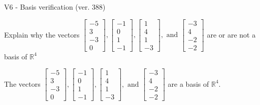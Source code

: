 \begin{exercise}
  \begin{exerciseTitle}V6 - Basis verification (ver. 388)\end{exerciseTitle}
  \begin{exerciseStatement}
    Explain why the vectors \(\left[\begin{array}{r}
-5 \\
3 \\
-3 \\
0
\end{array}\right] , \left[\begin{array}{r}
-1 \\
0 \\
1 \\
-1
\end{array}\right] , \left[\begin{array}{r}
1 \\
4 \\
1 \\
-3
\end{array}\right] , \text{ and } \left[\begin{array}{r}
-3 \\
4 \\
-2 \\
-2
\end{array}\right]\) are or are not a basis of \(\mathbb{R}^4\)	


  \end{exerciseStatement}
  \begin{exerciseAnswer}
   The vectors \(\left[\begin{array}{r}
-5 \\
3 \\
-3 \\
0
\end{array}\right] , \left[\begin{array}{r}
-1 \\
0 \\
1 \\
-1
\end{array}\right] , \left[\begin{array}{r}
1 \\
4 \\
1 \\
-3
\end{array}\right] , \text{ and } \left[\begin{array}{r}
-3 \\
4 \\
-2 \\
-2
\end{array}\right]\) 
  	 are  a basis of \(\mathbb{R}^4\).
  


  \end{exerciseAnswer}
\end{exercise}